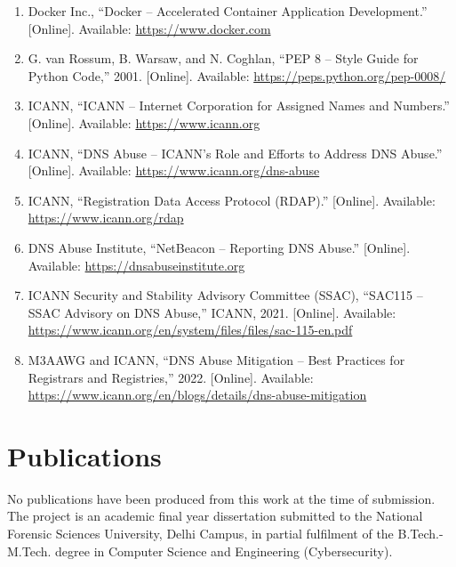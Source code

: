 \documentclass[12pt, a4paper, oneside]{report}
\begin{document}
\begin{enumerate}
  \item Docker Inc., ``Docker -- Accelerated Container Application Development.'' [Online]. Available: \url{https://www.docker.com}

  \item G. van Rossum, B. Warsaw, and N. Coghlan, ``PEP 8 -- Style Guide for Python Code,'' 2001. [Online]. Available: \url{https://peps.python.org/pep-0008/}

  \item ICANN, ``ICANN -- Internet Corporation for Assigned Names and Numbers.'' [Online]. Available: \url{https://www.icann.org}

  \item ICANN, ``DNS Abuse -- ICANN's Role and Efforts to Address DNS Abuse.'' [Online]. Available: \url{https://www.icann.org/dns-abuse}

  \item ICANN, ``Registration Data Access Protocol (RDAP).'' [Online]. Available: \url{https://www.icann.org/rdap}

  \item DNS Abuse Institute, ``NetBeacon -- Reporting DNS Abuse.'' [Online]. Available: \url{https://dnsabuseinstitute.org}

  \item ICANN Security and Stability Advisory Committee (SSAC), ``SAC115 -- SSAC Advisory on DNS Abuse,'' ICANN, 2021. [Online]. Available: \url{https://www.icann.org/en/system/files/files/sac-115-en.pdf}

  \item M3AAWG and ICANN, ``DNS Abuse Mitigation -- Best Practices for Registrars and Registries,'' 2022. [Online]. Available: \url{https://www.icann.org/en/blogs/details/dns-abuse-mitigation}

\end{enumerate}

\section*{Publications}

No publications have been produced from this work at the time of submission. The project is an academic final year dissertation submitted to the National Forensic Sciences University, Delhi Campus, in partial fulfilment of the B.Tech.-M.Tech. degree in Computer Science and Engineering (Cybersecurity).

\newpage
\ClearShipoutPictureBG

\end{document}
